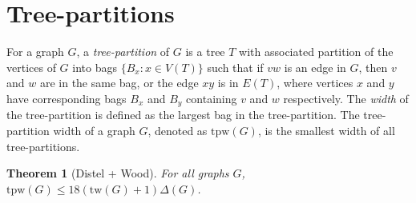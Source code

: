 \documentclass[]{article}
\newcommand{\tw}{\text{tw}}
\newtheorem{theorem}{Theorem}
\theoremstyle{definition}
\numberwithin{theorem}{section}
\numberwithin{equation}{section}
\begin{document}
\section{Tree-partitions}
\newcommand{\tpw}{\text{tpw}}

For a graph $G$, a \textit{tree-partition} of $G$ is a tree $T$ with associated partition of the vertices of $G$ into bags $ \lbrace B_x : x \in V(T) \rbrace$ such that if $vw$ is an edge in $G$, then $v$ and $w$ are in the same bag, or the edge $xy$ is in $E(T)$, where vertices $x$ and $y$ have corresponding bags $B_x$ and $B_y$ containing $v$ and $w$ respectively. The \textit{width} of the tree-partition is defined as the largest bag in the tree-partition. The tree-partition width of a graph $G$, denoted as $\tpw(G)$, is the smallest width of all tree-partitions. 


\begin{theorem}[Distel + Wood]
	For all graphs $G$, $\tpw(G) \leq 18 (\tw(G) + 1) \Delta(G)$. 
\end{theorem}
\end{document}
